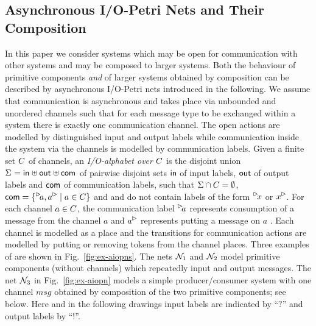 
\subsection{Asynchronous I/O-Petri Nets and Their Composition}\label{sec:aiopns-defs}

In this paper we consider systems which may be open for communication with other systems and may be composed to larger systems.
Both the behaviour of primitive components \emph{and} of larger systems obtained by composition can be described by asynchronous I/O-Petri nets introduced in the following.
We assume that communication is asynchronous and takes place via unbounded and unordered channels such that  for each message type to be exchanged within a system there is exactly one communication channel. 
The open actions are modelled by distinguished input and output labels while communication inside the system via the channels
is modelled by communication labels. 
Given a finite set $C$ of channels, an \emph{I/O-alphabet over $C$} is the disjoint union $\Sigma_{} = \mathsf{in}_{} \uplus \mathsf{out}_{} \uplus \mathsf{com}_{}$ of pairwise disjoint sets $\mathsf{in}$ of input labels, $\mathsf{out}$ of output labels and $\mathsf{com}$ of communication labels, such that $\Sigma \cap C = \emptyset$, $\com = \{\inact{a},\outact{a} \mid a \in \chan\}$ and \inset and \outset do not contain labels of the form $\inact{x}$ or $\outact{x}$.
For each channel $a \in C$, the communication label $\inact{a}$ represents consumption of a message from the channel $a$ and $\outact{a}$ represents putting a message on $a$ .
Each channel is modelled as a place and the transitions for communication actions are modelled
by putting or removing tokens from the channel places.
 Three examples of \AIOPNs are shown in Fig.~\ref{fig:ex-aiopns}. The nets $\mathcal{N}_1$ and $\mathcal{N}_2$ model primitive
components (without channels) which repeatedly input and output messages.
The net $\mathcal{N}_3$ in Fig.~\ref{fig:ex-aiopn} models a simple producer/consumer system with one channel $msg$
obtained by composition of the two primitive components; see below.
Here and in the following drawings input labels are indicated by ``$?$'' and output labels by ``$!$''. 


